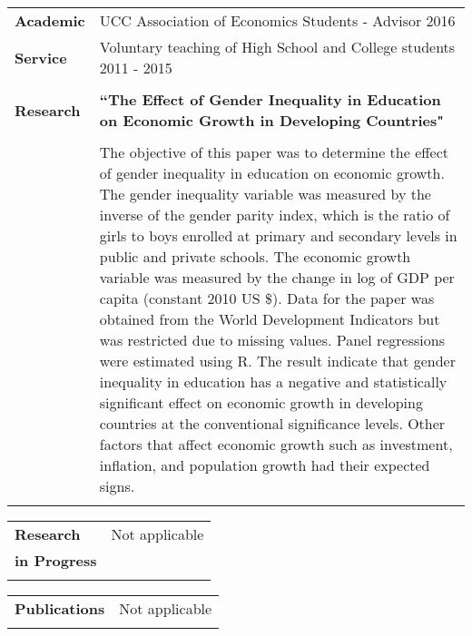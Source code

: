 \documentclass[final]{article}
\begin{document}
\begin{tabular}{@{} l l}
 \Large\textbf {Academic}    &  \hspace{7ex} UCC Association of Economics Students - Advisor \hspace{9ex} 2016 \\
     \Large\textbf {Service} & \hspace{7ex} Voluntary teaching of High School and College students \hspace{4ex} 2011 - 2015 \\
     & \\


    \Large\textbf{Research}    & \hspace{7.5ex} \parbox{5.0in}{\bf ``The Effect of Gender Inequality in Education on Economic Growth in Developing Countries"}\\
    & \\
    & \hspace{7.5ex} \parbox{5.0in}{The objective of this paper was to determine the effect of gender inequality in education on economic growth. The gender inequality variable was measured by the inverse of the gender parity index, which is the ratio of girls to boys enrolled at primary and secondary levels in public and private schools. The economic growth variable was measured by the change in log of GDP per capita (constant 2010 US \$). Data for the paper was obtained from the World Development Indicators but was restricted due to missing values. Panel regressions were estimated using R. The result indicate that gender inequality in education has a negative and statistically significant effect on economic growth in developing countries at the conventional significance levels. Other factors that affect economic growth such as investment, inflation, and population growth had their expected signs.}\\
    & \\
    \end{tabular}
    

\begin{tabular}{@{} l l}
 \Large\textbf {Research}    &  \hspace{5ex} Not applicable \\
     \Large\textbf {in Progress} \\
     & \\
\end{tabular}


\begin{tabular}{@{} l l}
 \Large\textbf {Publications}    &  \hspace{3ex} Not applicable \\
     & \\
\end{tabular}
\end{document}
